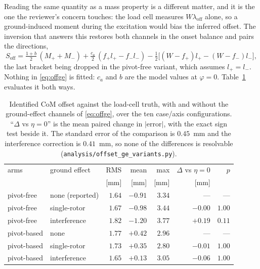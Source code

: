 \documentclass[10pt]{article}
\begin{document}
Reading the same quantity as a mass property is a different matter,
and it is the one the reviewer's concern touches: the load cell
measures $W\lambda_{\mathrm{off}}$ alone, so a ground-induced moment
during the excitation would bias the inferred offset. The inversion
that answers this restores both channels in the onset balance and
pairs the directions,
\begin{equation}
S_{\mathrm{off}} = \tfrac{1+b}{2}\,(M_+ + M_-)
+ \tfrac{c_a}{2}\,(f_+ l_+ - f_- l_-)
- \tfrac12\big[(W - f_+) l_+ - (W - f_-) l_-\big] ,
\label{eq:offge}
\end{equation}
the last bracket being dropped in the pivot-free variant, which
assumes $l_+ = l_-$. Nothing in \eqref{eq:offge} is fitted: $c_a$ and
$b$ are the model values at $\varphi = 0$. Table~\ref{tab:offge}
evaluates it both ways.

\begin{table}[h]
\centering
\small
\caption{Identified CoM offset against the load-cell truth, with and
without the ground-effect channels of \eqref{eq:offge}, over the ten
case/axis configurations. ``$\Delta$ vs $\eta = 0$'' is the mean
paired change in $|$error$|$, with the exact sign test beside it. The
standard error of the comparison is $0.45$~mm and the interference
correction is $0.41$~mm, so none of the differences is resolvable
(\texttt{analysis/offset\_ge\_variants.py}).}
\label{tab:offge}
\begin{tabular}{ll rrr rr}
\toprule
arms & ground effect & RMS & mean & max &
$\Delta$ vs $\eta{=}0$ & $p$ \\
 & & [mm] & [mm] & [mm] & [mm] & \\
\midrule
pivot-free & none (reported) & $1.64$ & $-0.91$ & $3.34$ & --- & --- \\
pivot-free & single-rotor & $1.67$ & $-0.98$ & $3.44$ & $-0.00$ & $1.00$ \\
pivot-free & interference & $1.82$ & $-1.20$ & $3.77$ & $+0.19$ & $0.11$ \\
\addlinespace[2pt]
pivot-based & none & $1.77$ & $+0.42$ & $2.96$ & --- & --- \\
pivot-based & single-rotor & $1.73$ & $+0.35$ & $2.80$ & $-0.01$ & $1.00$ \\
pivot-based & interference & $1.65$ & $+0.13$ & $3.05$ & $-0.06$ & $1.00$ \\
\bottomrule
\end{tabular}
\end{table}
\end{document}
